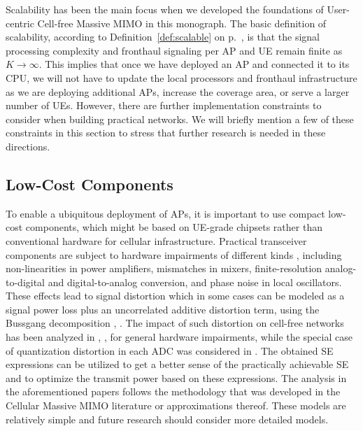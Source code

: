 Scalability has been the main focus when we developed the foundations of User-centric Cell-free Massive MIMO in this monograph. The basic definition of scalability, according to Definition~\ref{def:scalable} on p.~\pageref{def:scalable}, is that the signal processing complexity and fronthaul signaling per AP and UE remain finite as $K \to \infty$. This implies that once we have deployed an AP and connected it to its CPU, we will not have to update the local processors and fronthaul infrastructure as we are deploying additional APs, increase the coverage area, or serve a larger number of UEs. However, there are further implementation constraints to consider when building practical networks. We will briefly mention a few of these constraints in this section to stress that further research is needed in these directions.

\subsection{Low-Cost Components}
To enable a ubiquitous deployment of APs, it is important to use compact low-cost components, which might be based on UE-grade chipsets rather than conventional hardware for cellular infrastructure. Practical transceiver components are subject to hardware impairments of different kinds \cite{Schenk2008a}, including non-linearities in power amplifiers, mismatches in mixers, finite-resolution analog-to-digital and digital-to-analog conversion, and phase noise in local oscillators. These effects lead to signal distortion which in some cases can be modeled as a signal power loss plus an uncorrelated additive distortion term, using the Bussgang decomposition \cite{Bussgang1952a}, \cite{Demir2020a}.
The impact of such distortion on cell-free networks has been analyzed in \cite{Masoumi2020a}, \cite{Zhang2018a}, \cite{Zheng2020a} for general hardware impairments, while the special case of quantization distortion in each \gls{ADC} was considered in \cite{Hu2019a}. The obtained SE expressions can be utilized to get a better sense of the practically achievable SE and to optimize the transmit power based on these expressions.
The analysis in the aforementioned papers follows the methodology that was developed in the Cellular Massive MIMO literature
\cite{massivemimobook} or approximations thereof. These models are relatively simple and future research should consider more detailed models.


